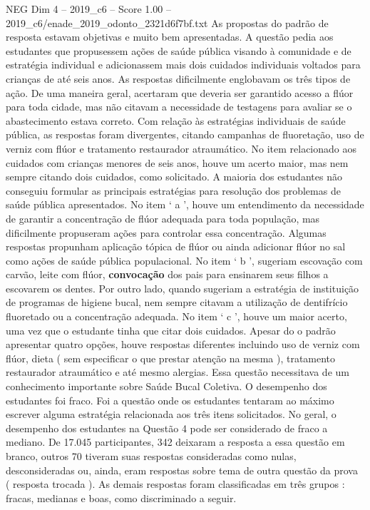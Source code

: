 \begin{textsample}{NEG Dim 4 – 2019\_c6 – Score 1.00 – 2019\_c6/enade\_2019\_odonto\_2321d6f7bf.txt}
As propostas do padrão de resposta estavam objetivas e muito bem apresentadas.
A questão pedia aos estudantes que propusessem ações de saúde pública visando à comunidade e de estratégia individual e adicionassem mais dois cuidados individuais voltados para crianças de até seis anos.
As respostas dificilmente englobavam os três tipos de ação.
De uma maneira geral, acertaram que deveria ser garantido acesso a flúor para toda cidade, mas não citavam a necessidade de testagens para avaliar se o abastecimento estava correto.
Com relação às estratégias individuais de saúde pública, as respostas foram divergentes, citando campanhas de fluoretação, uso de verniz com flúor e tratamento restaurador atraumático.
No item relacionado aos cuidados com crianças menores de seis anos, houve um acerto maior, mas nem sempre citando dois cuidados, como solicitado.
A maioria dos estudantes não conseguiu formular as principais estratégias para resolução dos problemas de saúde pública apresentados.
No item ‘ a ’, houve um entendimento da necessidade de garantir a concentração de flúor adequada para toda população, mas dificilmente propuseram ações para controlar essa concentração.
Algumas respostas propunham aplicação tópica de flúor ou ainda adicionar flúor no sal como ações de saúde pública populacional.
No item ‘ b ’, sugeriam escovação com carvão, leite com flúor, \textbf{convocação} dos pais para ensinarem seus filhos a escovarem os dentes.
Por outro lado, quando sugeriam a estratégia de instituição de programas de higiene bucal, nem sempre citavam a utilização de dentifrício fluoretado ou a concentração adequada.
No item ‘ c ’, houve um maior acerto, uma vez que o estudante tinha que citar dois cuidados.
Apesar do o padrão apresentar quatro opções, houve respostas diferentes incluindo uso de verniz com flúor, dieta ( sem especificar o que prestar atenção na mesma ), tratamento restaurador atraumático e até mesmo alergias.
Essa questão necessitava de um conhecimento importante sobre Saúde Bucal Coletiva.
O desempenho dos estudantes foi fraco.
Foi a questão onde os estudantes tentaram ao máximo escrever alguma estratégia relacionada aos três itens solicitados.
No geral, o desempenho dos estudantes na Questão 4 pode ser considerado de fraco a mediano.
De 17.045 participantes, 342 deixaram a resposta a essa questão em branco, outros 70 tiveram suas respostas consideradas como nulas, desconsideradas ou, ainda, eram respostas sobre tema de outra questão da prova ( resposta trocada ).
As demais respostas foram classificadas em três grupos : fracas, medianas e boas, como discriminado a seguir.

\end{textsample}
